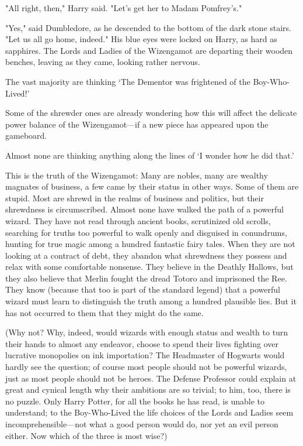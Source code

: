 "All right, then," Harry said. "Let's get her to Madam Pomfrey's."

"Yes," said Dumbledore, as he descended to the bottom of the dark stone stairs.
"Let us all go home, indeed." His blue eyes were locked on Harry, as hard as
sapphires.
\later
The Lords and Ladies of the Wizengamot are departing their wooden benches,
leaving as they came, looking rather nervous.

The vast majority are thinking `The Dementor was frightened of the
Boy-Who-Lived!'

Some of the shrewder ones are already wondering how this will affect the
delicate power balance of the Wizengamot---if a new piece has appeared upon the
gameboard.

Almost none are thinking anything along the lines of `I wonder how he did that.'

This is the truth of the Wizengamot: Many are nobles, many are wealthy magnates
of business, a few came by their status in other ways. Some of them are stupid.
Most are shrewd in the realms of business and politics, but their shrewdness is
circumscribed. Almost none have walked the path of a powerful wizard. They have
not read through ancient books, scrutinized old scrolls, searching for truths
too powerful to walk openly and disguised in conundrums, hunting for true magic
among a hundred fantastic fairy tales. When they are not looking at a contract
of debt, they abandon what shrewdness they possess and relax with some
comfortable nonsense. They believe in the Deathly Hallows, but they also
believe that Merlin fought the dread Totoro and imprisoned the Ree. They know
(because that too is part of the standard legend) that a powerful wizard must
learn to distinguish the truth among a hundred plausible lies. But it has not
occurred to them that they might do the same.

(Why not? Why, indeed, would wizards with enough status and wealth to turn
their hands to almost any endeavor, choose to spend their lives fighting over
lucrative monopolies on ink importation? The Headmaster of Hogwarts would
hardly see the question; of course most people should not be powerful wizards,
just as most people should not be heroes. The Defense Professor could explain
at great and cynical length why their ambitions are so trivial; to him, too,
there is no puzzle. Only Harry Potter, for all the books he has read, is unable
to understand; to the Boy-Who-Lived the life choices of the Lords and Ladies
seem incomprehensible---not what a good person would do, nor yet an evil person
either. Now which of the three is most wise?)

